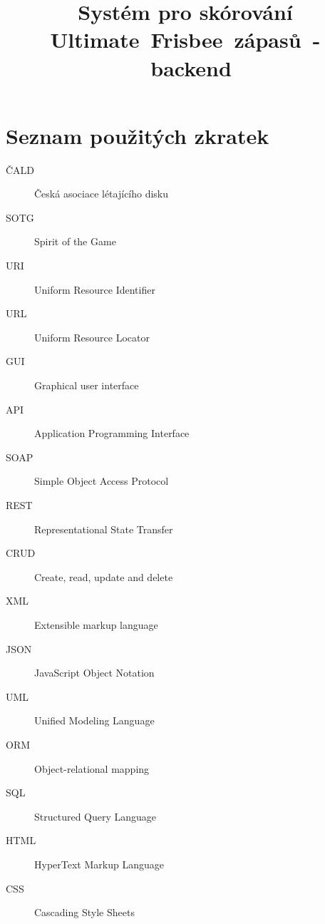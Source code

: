 \documentclass[thesis=B,czech]{FITthesis}[2012/06/26]
\title{Systém pro skórování Ultimate~Frisbee~zápasů~-~backend}
\begin{document}
 
 




 

 












%
%
%



\appendix
% 
\chapter{Seznam použitých zkratek}
\begin{description}
	\item[ČALD] Česká asociace létajícího disku
	\item[SOTG] Spirit of the Game
	\item[URI] Uniform Resource Identifier
	\item[URL] Uniform Resource Locator
	\item[GUI] Graphical user interface
	\item[API] Application Programming Interface
	\item[SOAP] Simple Object Access Protocol
	\item[REST] Representational State Transfer
	\item[CRUD] Create, read, update and delete
	\item[XML] Extensible markup language
	\item[JSON] JavaScript Object Notation
	\item[UML] Unified Modeling Language
	\item[ORM] Object-relational mapping
	\item[SQL] Structured Query Language
	\item[HTML] HyperText Markup Language
	\item[CSS] Cascading Style Sheets

\end{description}
\end{document}

